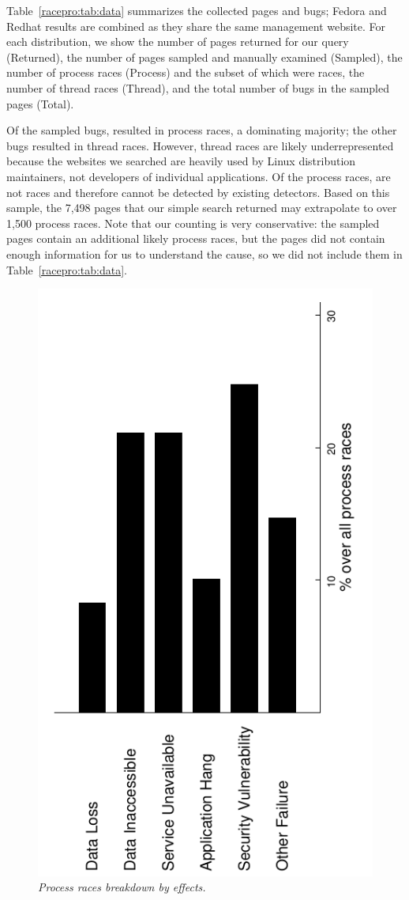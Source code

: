 Table~\ref{racepro:tab:data} summarizes the collected pages and bugs;
Fedora and Redhat results are combined as they share the same
management website.   For each distribution, we show the number of
pages returned for our query (Returned), the number of pages sampled
and manually examined (Sampled), the number of process races
(Process) and the subset of
which were \toctou races, the number of thread races
(Thread), and the total number of bugs in the sampled pages (Total).

  Of the \nbug sampled bugs, \nprace
resulted in process races, a dominating majority; the other \nmrace
bugs resulted in thread races.  However, thread races are
likely underrepresented because the websites we searched are heavily
used by Linux distribution maintainers, not developers of individual
applications.  Of the \nprace process races, 
\nnottoctou are not \toctou races and therefore cannot
be detected by existing \toctou detectors. 
Based on this sample, the 7,498 pages that our simple search returned
may extrapolate to over 1,500 process races.  Note that our
counting is very conservative: the sampled pages contain an additional
\npraceunconfirmed likely process races, but the pages did
not contain enough information for us to understand the cause, so we
did not include them in Table~\ref{racepro:tab:data}.

\begin{figure}[t]
  \includegraphics[width=0.45\linewidth,angle=270]{figures/racepro/race-effects}
  \caption{\em Process races breakdown by effects.} \label{racepro:fig:effects}
\end{figure}

